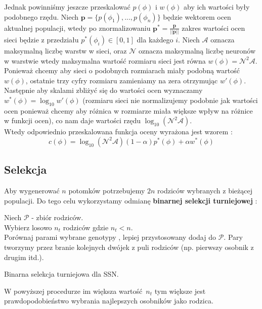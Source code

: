 \documentclass{article}
\renewcommand{\vec}[1]{\mathbf{#1}}
\begin{document}
Jednak powinniśmy jeszcze przeskalować $p(\phi)$ i $w(\phi)$ aby ich wartości były podobnego 
rzędu. Niech $\vec{p} = \{p(\phi_1), ..., p(\phi_n)\}$ będzie wektorem ocen aktualnej populacji,
wtedy po znormalizowaniu $\vec{p}^{*} = \frac{\vec{p}}{||\vec{p}||}$ zakres wartości ocen sieci
będzie z przedziału $p^{*}(\phi_i) \in [0, 1]$ dla każdego $i$. Niech $\mathcal{A}$ oznacza
maksymalną liczbę warstw w sieci, oraz $\mathcal{N}$ oznacza maksymalną liczbę neuronów w 
warstwie wtedy maksymalna wartość rozmiaru sieci jest równa $w(\phi) = \mathcal{N}^2\mathcal{A}$.
Ponieważ chcemy aby sieci o podobnych rozmiarach miały podobną wartość $w(\phi)$,
ostatnie trzy cyfry rozmiaru zamieniamy na zera otrzymując $w'(\phi)$.
Następnie aby skalami zbliżyć się do 
wartości ocen  wyznaczamy $w^{*}(\phi) = \log_{10}w'(\phi)$ (rozmiaru sieci
nie normalizujemy podobnie jak wartości ocen ponieważ chcemy aby różnica w rozmiarze
miała większe wpływ na różnice w funkcji ocen), co nam daje wartości
rzędu $\log_{10}(\mathcal{N}^2\mathcal{A})$.\\
Wtedy odpowiednio przeskalowana funkcja oceny wyrażona jest wzorem \cite{ams}:
\begin{equation}
	c(\phi) = \log_{10}(\mathcal{N}^2\mathcal{A})(1 - \alpha)p^{*}(\phi) + \alpha w^{*}(\phi)
\end{equation}

\subsection{Selekcja}
\label{sec:turniej}

Aby wygenerować $n$ potomków potrzebujemy $2n$ rodziców wybranych z bieżącej populacji.
Do tego celu wykorzystamy odmianę \textbf{binarnej selekcji turniejowej} \cite{ams}:\\
\begin{algorithm}[H]
 Niech $\mathcal{P}$ - zbiór rodziców.\\
 Wybierz losowo $n_t$ rodziców gdzie $n_t < n$.\\
  {
	Porównaj parami wybrane genotypy , lepiej przystosowany dodaj do $\mathcal{P}$.
	Pary tworzymy przez branie kolejnych dwójek z puli rodziców (np. pierwszy osobnik z 
	drugim itd.).
 }
 \caption{Binarna selekcja turniejowa dla SSN.}
\end{algorithm}
W powyższej procedurze im większa wartość $n_t$ tym większe jest prawdopodobieństwo wybrania
najlepszych osobników jako rodzica.
\end{document}
